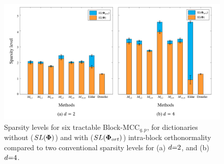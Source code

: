 \begin{figure}[!b]
\centering
\includegraphics[width=1\textwidth,keepaspectratio]{images/SL_d_Opt_Eldar_Donoho.png}
\centering
\caption{Sparsity levels for six tractable Block-MCC$_{q,p}$, for dictionaries without ($SL(\boldsymbol{\Phi})$) and with ($SL(\boldsymbol{\Phi}_{ort})$) intra-block orthonormality compared to two conventional sparsity levels for (a) $d {=} 2$, and (b) $d {=} 4$.}
\label{fig:SL_d_Opt_Eldar_Donoho}
\end{figure}